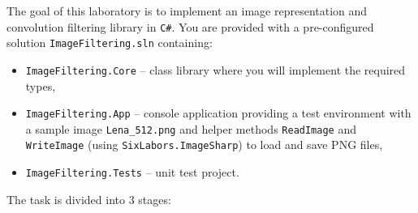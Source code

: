 \documentclass[11pt,a4paper,addpoints]{exam}
\begin{document}
\sloppy

\cellwidth{2.5cm}
\noindent \gradetable[h]

\vspace{0.4cm}

The goal of this laboratory is to implement an image representation and convolution filtering library in \texttt{C\#}.
You are provided with a pre-configured solution \texttt{ImageFiltering.sln} containing:
\begin{itemize}
    \item \texttt{ImageFiltering.Core} -- class library where you will implement the required types,
    \item \texttt{ImageFiltering.App} -- console application providing a test environment with a sample image \texttt{Lena\_512.png} and helper methods \texttt{ReadImage} and \texttt{WriteImage} (using \texttt{SixLabors.ImageSharp}) to load and save PNG files,
    \item \texttt{ImageFiltering.Tests} -- unit test project.
\end{itemize}

The task is divided into 3 stages:
\end{document}
